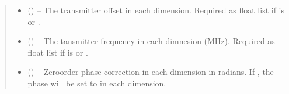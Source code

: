 \documentclass[letterpaper,10pt,english]{sphinxmanual}
\begin{document}
\begin{fulllineitems}
\begin{quote}
\begin{description}
\begin{itemize}
\item {} 
\sphinxAtStartPar
{} (\sphinxstyleliteralemphasis{\sphinxupquote{{[}}}\sphinxstyleliteralemphasis{\sphinxupquote{{]}}}\sphinxstyleliteralemphasis{\sphinxupquote{, }}\sphinxstyleliteralemphasis{\sphinxupquote{{[}}}\sphinxstyleliteralemphasis{\sphinxupquote{, }}\sphinxstyleliteralemphasis{\sphinxupquote{{]} or }}\sphinxstyleliteralemphasis{\sphinxupquote{, }}) – The transmitter offset in each dimension. Required as float
list if  is  or .

\item {} 
\sphinxAtStartPar
{} (\sphinxstyleliteralemphasis{\sphinxupquote{{[}}}\sphinxstyleliteralemphasis{\sphinxupquote{{]}}}\sphinxstyleliteralemphasis{\sphinxupquote{, }}\sphinxstyleliteralemphasis{\sphinxupquote{{[}}}\sphinxstyleliteralemphasis{\sphinxupquote{, }}\sphinxstyleliteralemphasis{\sphinxupquote{{]} or }}\sphinxstyleliteralemphasis{\sphinxupquote{, }}) – The tansmitter frequency in each dimnesion (MHz). Required as float
list if  is  or .

\item {} 
\sphinxAtStartPar
{} (\sphinxstyleliteralemphasis{\sphinxupquote{{[}}}\sphinxstyleliteralemphasis{\sphinxupquote{{]}}}\sphinxstyleliteralemphasis{\sphinxupquote{, }}\sphinxstyleliteralemphasis{\sphinxupquote{{[}}}\sphinxstyleliteralemphasis{\sphinxupquote{, }}\sphinxstyleliteralemphasis{\sphinxupquote{{]}}}) – Zero\sphinxhyphen{}order phase correction in each dimension in radians. If ,
the phase will be set to  in each dimension.


\end{itemize}
\end{description}
\end{quote}
\end{fulllineitems}
\end{document}
